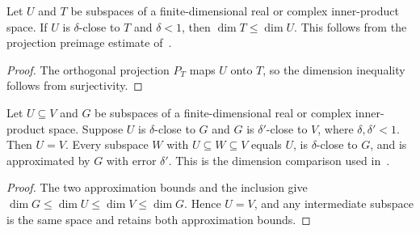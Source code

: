 \begin{theorem}
    \label{thm:subspace_close_dimension}
    \leanok
    Let $U$ and $T$ be subspaces of a finite-dimensional real or complex
    inner-product space. If $U$ is $\delta$-close to $T$ and $\delta<1$,
    then $\dim T\le\dim U$. This follows from the projection preimage
    estimate of~\cite[lines 449--465]{Arad2016RigorousRG}.
\end{theorem}

\begin{proof}
    \leanok
    The orthogonal projection $P_T$ maps $U$ onto $T$, so the dimension
    inequality follows from surjectivity.
\end{proof}

\begin{theorem}
    \label{thm:subspace_close_nested_equal}
    \leanok
    Let $U\subseteq V$ and $G$ be subspaces of a finite-dimensional real
    or complex inner-product space. Suppose $U$ is $\delta$-close to $G$
    and $G$ is $\delta'$-close to $V$, where $\delta,\delta'<1$.
    Then $U=V$. Every subspace $W$ with $U\subseteq W\subseteq V$ equals
    $U$, is $\delta$-close to $G$, and is approximated by $G$ with error
    $\delta'$. This is the dimension comparison used
    in~\cite[lines 1010--1024]{Arad2016RigorousRG}.
\end{theorem}

\begin{proof}
    \leanok
    The two approximation bounds and the inclusion give
    $\dim G\le\dim U\le\dim V\le\dim G$. Hence $U=V$, and any intermediate
    subspace is the same space and retains both approximation bounds.
\end{proof}


